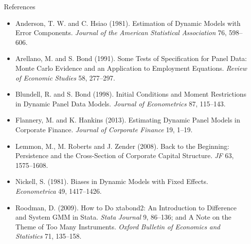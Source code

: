 \documentclass[
  11pt,
  ignorenonframetext,
  aspectratio=169,
]{beamer}
\providecommand{\tightlist}{%
  \setlength{\itemsep}{0pt}\setlength{\parskip}{0pt}}
\begin{document}
\begin{frame}{References}
\protect{}\label{references}
\tiny

\begin{itemize}
\tightlist
\item
  Anderson, T. W. and C. Hsiao (1981). Estimation of Dynamic Models with
  Error Components. \emph{Journal of the American Statistical
  Association} 76, 598--606.
\item
  Arellano, M. and S. Bond (1991). Some Tests of Specification for Panel
  Data: Monte Carlo Evidence and an Application to Employment Equations.
  \emph{Review of Economic Studies} 58, 277--297.
\item
  Blundell, R. and S. Bond (1998). Initial Conditions and Moment
  Restrictions in Dynamic Panel Data Models. \emph{Journal of
  Econometrics} 87, 115--143.
\item
  Flannery, M. and K. Hankins (2013). Estimating Dynamic Panel Models in
  Corporate Finance. \emph{Journal of Corporate Finance} 19, 1--19.
\item
  Lemmon, M., M. Roberts and J. Zender (2008). Back to the Beginning:
  Persistence and the Cross-Section of Corporate Capital Structure.
  \emph{JF} 63, 1575--1608.
\item
  Nickell, S. (1981). Biases in Dynamic Models with Fixed Effects.
  \emph{Econometrica} 49, 1417--1426.
\item
  Roodman, D. (2009). How to Do xtabond2: An Introduction to Difference
  and System GMM in Stata. \emph{Stata Journal} 9, 86--136; and A Note
  on the Theme of Too Many Instruments. \emph{Oxford Bulletin of
  Economics and Statistics} 71, 135--158.
\end{itemize}
\end{frame}
\end{document}

